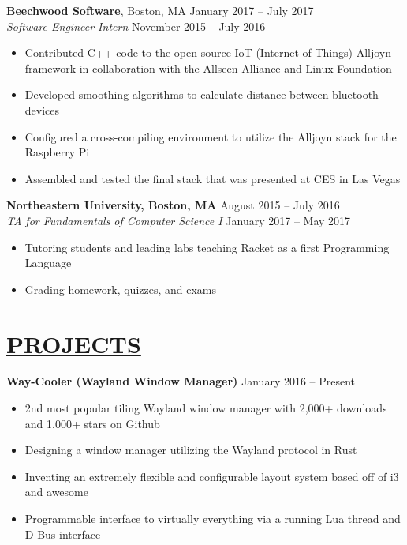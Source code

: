 \documentclass[overlapped,line]{res}
\begin{document}
\begin{resume}
\textbf{Beechwood Software}, Boston, MA \hfill January 2017 \--- July 2017\\
                 {\sl Software Engineer Intern} \hfill November 2015 \--- July 2016
                 \begin{itemize}  \itemsep -2pt
                 \item Contributed C++ code to the open-source IoT (Internet of Things) Alljoyn framework in collaboration with the Allseen Alliance and Linux Foundation
                 \item Developed smoothing algorithms to calculate distance between bluetooth devices
                 \item Configured a cross-compiling environment to utilize the Alljoyn stack for the Raspberry Pi
                 \item Assembled and tested the final stack that was presented at CES in Las Vegas
                \end{itemize}
\textbf{Northeastern University, Boston, MA } \hfill August 2015 \--- July 2016 \\
              	{\sl TA for Fundamentals of Computer Science I} \hfill January 2017 \--- May 2017
              	\begin{itemize} \itemsep -2pt
              	\item  Tutoring students and leading labs teaching Racket as a first Programming Language
              	\item Grading homework, quizzes, and exams  \vspace{-1em}
              	\end{itemize}
\noindent\makebox[7.15in]{\rule{7.15in}{0.4pt}}
\section{\underline{PROJECTS}}
\textbf{Way-Cooler (Wayland Window Manager)} \hfill January 2016 \--- Present
				\begin{itemize}  \itemsep -2pt
				\item 2nd most popular tiling Wayland window manager with 2,000+ downloads and 1,000+ stars on Github
				\item Designing a window manager utilizing the Wayland protocol in Rust
				\item Inventing an extremely flexible and configurable layout system based off of i3 and awesome
				\item Programmable interface to virtually everything via a running Lua thread and D-Bus interface
				\end{itemize}


\end{resume}
\end{document}
